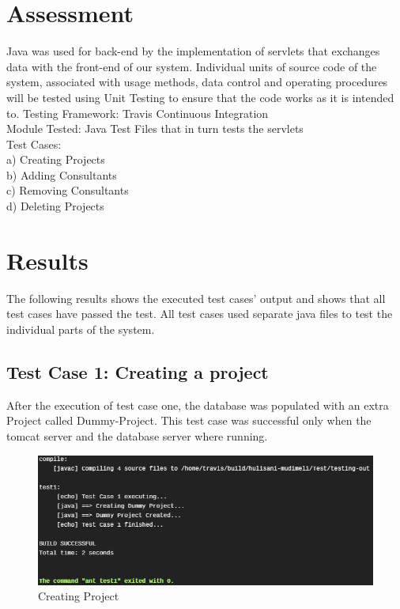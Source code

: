 \documentclass[a4paper, 12pt, oneside]{article}
\begin{document}
\section{Assessment}
Java was used for back-end by the implementation of servlets that exchanges data with the front-end of our system. Individual units of source code of the system, associated with usage methods, data control and operating procedures will be tested using Unit Testing to ensure that the code works as it is intended to.
\pagebreak
Testing Framework: Travis Continuous Integration\\
Module Tested: Java Test Files that in turn tests the servlets\\
Test Cases:\\
\hspace*{10mm}a)	Creating Projects\\
\hspace*{10mm}b)	Adding Consultants\\
\hspace*{10mm}c)	Removing Consultants\\
\hspace*{10mm}d)	Deleting Projects\\

\section{Results}
The following results shows the executed test cases’ output and shows that all test cases have passed the test. All test cases used separate java files to test the individual parts of the system.

\subsection{Test Case 1: Creating a project}

After the execution of test case one, the database was populated with an extra Project called Dummy-Project. This test case was successful only when the tomcat server and the database server where running.

\begin{figure}[!htb]

\centering

\includegraphics[width=\linewidth]{images/test1.png}

\caption{Creating Project}

\label{fig:sfig1}

\end{figure}
\end{document}
